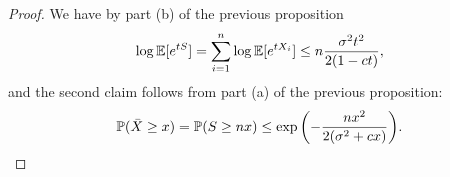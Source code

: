 \begin{proof}
	We have by part (b) of the previous proposition
	\[
	\log\mathbb E[e^{tS}] = \sum_{i=1}^n \log \mathbb E[e^{tX_i}] \leq n \frac{\sigma^2 t^2}{2(1 - ct)},
	\]
	and the second claim follows from part (a) of the previous proposition:
	\[
	\mathbb P(\bar X \geq x) = \mathbb P(S \geq nx) \leq \exp\qty(- \frac{nx^2}{2(\sigma^2 + cx)}). 
	\]
\end{proof}